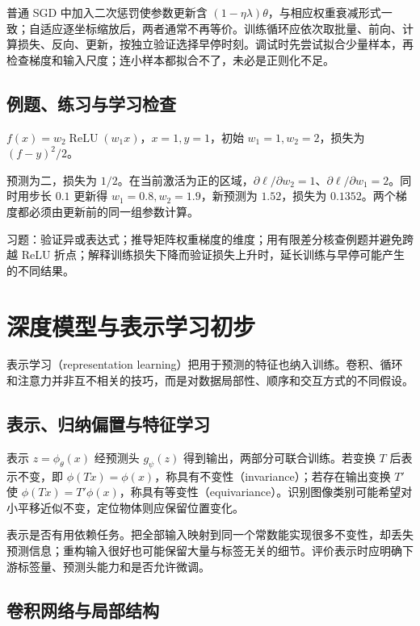 \documentclass[UTF8,12pt,a4paper,fontset=fandol]{ctexbook}
\begin{document}
普通 SGD 中加入二次惩罚使参数更新含 $(1-\eta\lambda)\theta$，与相应权重衰减形式一致；自适应逐坐标缩放后，两者通常不再等价。训练循环应依次取批量、前向、计算损失、反向、更新，按独立验证选择早停时刻。调试时先尝试拟合少量样本，再检查梯度和输入尺度；连小样本都拟合不了，未必是正则化不足。

\section{例题、练习与学习检查}

\begin{example}[一个两层网络的梯度]
$f(x)=w_2\operatorname{ReLU}(w_1x)$，$x=1,y=1$，初始 $w_1=1,w_2=2$，损失为 $(f-y)^2/2$。
\end{example}
\begin{solve}
预测为二，损失为 $1/2$。在当前激活为正的区域，$\partial\ell/\partial w_2=1$、$\partial\ell/\partial w_1=2$。同时用步长 $0.1$ 更新得 $w_1=0.8,w_2=1.9$，新预测为 $1.52$，损失为 $0.1352$。两个梯度都必须由更新前的同一组参数计算。
\end{solve}

习题：验证异或表达式；推导矩阵权重梯度的维度；用有限差分核查例题并避免跨越 ReLU 折点；解释训练损失下降而验证损失上升时，延长训练与早停可能产生的不同结果。

\chapter{深度模型与表示学习初步}
\label{chap:ml-representation}

表示学习（representation learning）把用于预测的特征也纳入训练。卷积、循环和注意力并非互不相关的技巧，而是对数据局部性、顺序和交互方式的不同假设。

\section{表示、归纳偏置与特征学习}

表示 $z=\phi_\theta(x)$ 经预测头 $g_\psi(z)$ 得到输出，两部分可联合训练。若变换 $T$ 后表示不变，即 $\phi(Tx)=\phi(x)$，称具有不变性（invariance）；若存在输出变换 $T'$ 使 $\phi(Tx)=T'\phi(x)$，称具有等变性（equivariance）。识别图像类别可能希望对小平移近似不变，定位物体则应保留位置变化。

表示是否有用依赖任务。把全部输入映射到同一个常数能实现很多不变性，却丢失预测信息；重构输入很好也可能保留大量与标签无关的细节。评价表示时应明确下游标签量、预测头能力和是否允许微调。

\section{卷积网络与局部结构}
\end{document}
